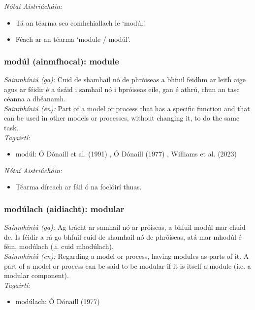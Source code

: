  \noindent \textit{Nótaí Aistriúcháin:}
\begin{itemize}
	\item Tá an téarma seo comhchiallach le `modúl'.
	\item Féach ar an téarma `module / modúl'.
\end{itemize}


\subsubsection*{modúl (ainmfhocal): module}
 \noindent \textit{Sainmhíniú (ga):} Cuid de shamhail nó de phróiseas a bhfuil feidhm ar leith aige agus ar féidir é a úsáid i samhail nó i bpróiseas eile, gan é athrú, chun an tasc céanna a dhéanamh.
\\
 \noindent \textit{Sainmhíniú (en):} Part of a model or process that has a specific function and that can be used in other models or processes, without changing it, to do the same task.
\\
 \noindent \textit{Tagairtí:}
\begin{itemize}
	\item modúl: Ó Dónaill et al. (1991) \cite{focloir-beag}, Ó Dónaill (1977) \cite{odonaill}, Williams et al. (2023) \cite{storchiste}
\end{itemize}

 \noindent \textit{Nótaí Aistriúcháin:}
\begin{itemize}
	\item Téarma díreach ar fáil ó na foclóirí thuas.
\end{itemize}


\subsubsection*{modúlach (aidiacht): modular}
 \noindent \textit{Sainmhíniú (ga):} Ag trácht ar samhail nó ar próiseas, a bhfuil modúl mar chuid de. Is féidir a rá go bhfuil cuid de shamhail nó de phróiseas, atá mar mhodúl é féin, modúlach (.i. cuid mhodúlach).
\\
 \noindent \textit{Sainmhíniú (en):} Regarding a model or process, having modules as parts of it. A part of a model or process can be said to be modular if it is itself a module (i.e. a modular component).
\\
 \noindent \textit{Tagairtí:}
\begin{itemize}
	\item modúlach: Ó Dónaill (1977) \cite{odonaill}
\end{itemize}

